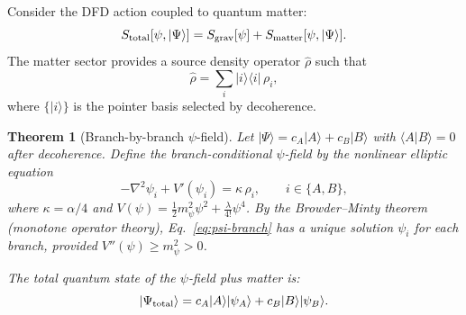 \documentclass[11pt,a4paper]{article}
\newtheorem{theorem}{Theorem}[section]
\theoremstyle{remark}
\begin{document}
Consider the DFD action coupled to quantum matter:
\begin{equation}
S_{\rm total}[\psi, |\Psi\rangle] = S_{\rm grav}[\psi] + S_{\rm matter}[\psi, |\Psi\rangle].
\end{equation}
The matter sector provides a source density operator $\hat\rho$ such that
\begin{equation}
\hat\rho = \sum_i |i\rangle\langle i|\,\rho_i,
\end{equation}
where $\{|i\rangle\}$ is the pointer basis selected by decoherence.

\begin{theorem}[Branch-by-branch $\psi$-field]
\label{thm:branch}
Let $|\Psi\rangle = c_A|A\rangle + c_B|B\rangle$ with $\langle A|B\rangle = 0$
after decoherence. Define the branch-conditional $\psi$-field by the
nonlinear elliptic equation
\begin{equation}\label{eq:psi-branch}
-\nabla^2\psi_i + V'(\psi_i) = \kappa\,\rho_i, \qquad i \in \{A, B\},
\end{equation}
where $\kappa = \alpha/4$ and $V(\psi) = \frac{1}{2}m_\psi^2\psi^2 + \frac{\lambda}{4!}\psi^4$.
By the Browder--Minty theorem (monotone operator theory), Eq.~\eqref{eq:psi-branch}
has a unique solution $\psi_i$ for each branch, provided $V''(\psi) \geq m_\psi^2 > 0$.

The total quantum state of the $\psi$-field plus matter is:
\begin{equation}
|\Psi_{\rm total}\rangle = c_A|A\rangle|\psi_A\rangle + c_B|B\rangle|\psi_B\rangle.
\end{equation}
\end{theorem}
\end{document}
